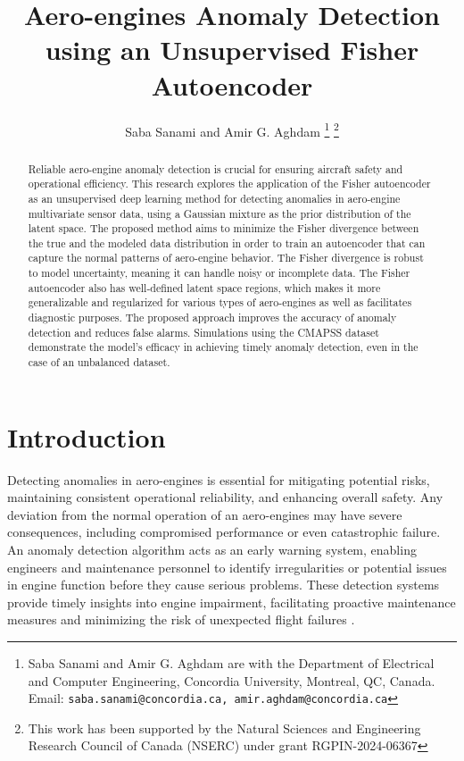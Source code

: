 \documentclass[journal]{IEEEtran}
\title{Aero-engines Anomaly Detection using an Unsupervised Fisher Autoencoder}
\author{Saba Sanami and Amir G. Aghdam
\thanks{Saba Sanami and Amir G. Aghdam are with the Department of Electrical and Computer Engineering, Concordia University, Montreal, QC, Canada. Email: {\tt\small saba.sanami@concordia.ca, amir.aghdam@concordia.ca}}
\thanks{This work has been supported by the Natural Sciences and Engineering Research Council of Canada (NSERC) under grant RGPIN-2024-06367}}
\begin{document}
\maketitle
\thispagestyle{empty}
\pagestyle{empty}


\begin{abstract}

Reliable aero-engine anomaly detection is crucial for ensuring aircraft safety and operational efficiency. This research explores the application of the Fisher autoencoder as an unsupervised deep learning method for detecting anomalies in aero-engine multivariate sensor data, using a Gaussian mixture as the prior distribution of the latent space. The proposed method aims to minimize the Fisher divergence between the true and the modeled data distribution in order to train an autoencoder that can capture the normal patterns of aero-engine behavior. The Fisher divergence is robust to model uncertainty, meaning it can handle noisy or incomplete data. The Fisher autoencoder also has well-defined latent space regions, which makes it more generalizable and regularized for various types of aero-engines as well as facilitates diagnostic purposes. The proposed approach improves the accuracy of anomaly detection and reduces false alarms. Simulations using the CMAPSS dataset demonstrate the model's efficacy in achieving timely anomaly detection, even in the case of an unbalanced dataset.


\end{abstract}


\section{Introduction}


Detecting anomalies in aero-engines is essential for mitigating potential risks, maintaining consistent operational reliability, and enhancing overall safety. Any deviation from the normal operation of an aero-engines may have severe consequences, including compromised performance or even catastrophic failure. An anomaly detection algorithm acts as an early warning system, enabling engineers and maintenance personnel to identify irregularities or potential issues in engine function before they cause serious problems. These detection systems provide timely insights into engine impairment, facilitating proactive maintenance measures and minimizing the risk of unexpected flight failures \cite{imp1,imp2,imp3,imp4}.
\end{document}

